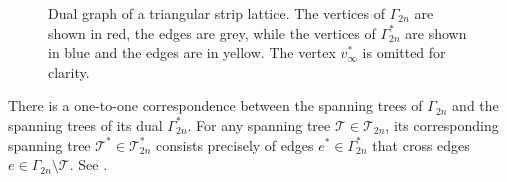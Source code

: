 \documentclass{amsart}
\theoremstyle{definition}
\newcommand{\saugat}[1]{\marginpar{\tiny \color{blue} Saugat: #1}}
\begin{document}
\begin{figure}[H]
    \caption{Dual graph of a triangular strip lattice. The vertices of $\Gamma_{2n}$ are shown in red, the edges are grey, while the vertices of $\Gamma_{2n}^*$ are shown in blue and the edges are in yellow. The vertex $v_\infty^*$ is omitted for clarity.}
    \label{fig:dual_graph}
\end{figure}
There is a one-to-one correspondence between the spanning trees of $\Gamma_{2n}$ and the spanning trees of its dual $\Gamma_{2n}^*.$ For any spanning tree $\mathcal{T} \in \mathscr{T}_{2n}$, its corresponding spanning tree $\mathcal{T}^*    \in \mathscr{T}^*_{2n}$ consists precisely of edges $e^*\in \Gamma_{2n}^*$ that cross edges $e \in \Gamma_{2n} \setminus \mathcal{T}.$ See .
\end{document}
